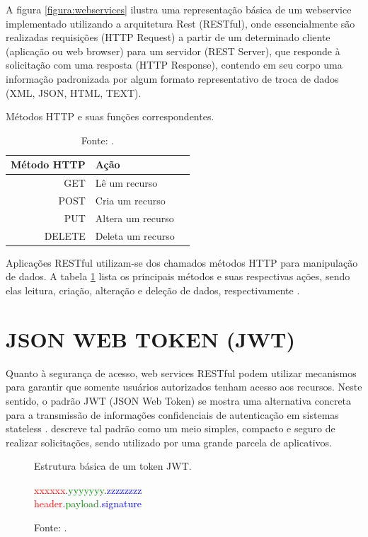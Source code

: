 \pagebreak
A figura \ref{figura:webservices} ilustra uma representação básica de um webservice implementado utilizando a arquitetura Rest (RESTful), onde essencialmente são realizadas requisições (HTTP Request) a partir de um determinado cliente (aplicação ou web browser) para um servidor (REST Server), que responde à solicitação com uma resposta (HTTP Response), contendo em seu corpo uma informação padronizada por algum formato representativo de troca de dados (XML, JSON, HTML, TEXT).

\begin{table}[h]
	\captionsetup{justification=centering}
	\centering
	\caption{Métodos HTTP e suas funções correspondentes.}
	\caption*{Fonte: .}
	\label{tabela:metodoshttp}
	\begin{tabular}{r|lr}
		Método HTTP &  Ação\\
		\hline
		GET & Lê um recurso  \\
		POST & Cria um recurso  \\
		PUT & Altera um recurso \\
		DELETE & Deleta um recurso 
	\end{tabular}
\end{table}

Aplicações RESTful utilizam-se dos chamados métodos HTTP para manipulação de dados. A tabela \ref{tabela:metodoshttp} lista os principais métodos e suas respectivas ações, sendo elas leitura, criação, alteração e deleção de dados, respectivamente \cite{pautasso2008restful}.

\section{JSON WEB TOKEN (JWT)}

Quanto à segurança de acesso, web services RESTful podem utilizar mecanismos para garantir que somente usuários autorizados tenham acesso aos recursos. Neste sentido, o padrão JWT (JSON Web Token) \cite{jwt} se mostra uma alternativa concreta para a transmissão de informações confidenciais de autenticação em sistemas stateless \cite{jones2015json}.  descreve tal padrão como um meio simples, compacto e seguro de realizar solicitações, sendo utilizado por uma grande parcela de aplicativos.

\begin{figure}[h]
	\caption{Estrutura básica de um token JWT.}
	\caption*{Fonte: .}
	\label{figura:jwt}
	\begin{center}
		\textcolor{red}{xxxxxx}.\textcolor{green}{yyyyyyy}.\textcolor{blue}{zzzzzzzz}\\
		\textcolor{red}{header}.\textcolor{green}{payload}.\textcolor{blue}{signature}\\
	\end{center}
\end{figure}

